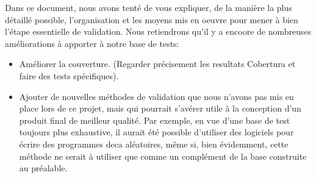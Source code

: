 \documentclass{article}
\begin{document}
Dans ce document, nous avons tenté de vous expliquer, de la manière la plus détaillé possible,
l'organisation et les moyens mis en oeuvre pour mener à bien l'étape essentielle de validation.
Nous retiendrons qu'il y a encoore de nombreuses améliorations à apporter à notre base de tests:
\begin{itemize}
\item Améliorer la couverture. (Regarder précisement les resultats Cobertura et faire des tests spécifiques).
\item Ajouter de nouvelles méthodes de validation que nous n'avons pas mis en place lors de ce projet, mais qui pourrait s'avérer utile
à la conception d'un produit final de meilleur qualité. Par exemple, en vue d'une
base de test toujours plus exhaustive,  il aurait été possible d'utiliser des logiciels pour
écrire des programmes deca aléatoires, même si, bien évidemment,  cette méthode ne serait à utiliser que comme
un complément de la base construite au préalable.
\end{itemize}
\end{document}
